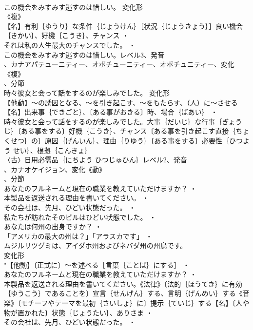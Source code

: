 \documentclass[8pt]{extreport}
\begin{document}
\begin{CJK}{UTF8}{min}
\\	この機会をみすみす逃すのは惜しい。	変化形 
\\	《複》
\\	【名】有利｛ゆうり｝な条件｛じょうけん｝［状況｛じょうきょう｝］良い機会｛きかい｝、好機｛こうき｝、チャンス ・
\\	それは私の人生最大のチャンスでした。 ・
\\	この機会をみすみす逃すのは惜しい。レベル3、発音
\\	、カナアパテューニティー、オポチューニティー、オポチュニティー、変化《複》
\\	、分節
\\	時々彼女と会って話をするのが楽しみでした。	変化形 
\\	【他動】～の誘因となる、～を引き起こす、～をもたらす、（人）に～させる【名】出来事｛できごと｝、〔ある事がおきる〕時、場合｛ばあい｝ ・
\\	時々彼女と会って話をするのが楽しみでした。大事｛だいじ｝な行事｛ぎょうじ｝〔ある事をする〕好機｛こうき｝、チャンス〔ある事を引き起こす直接｛ちょくせつ｝の〕原因｛げんいん｝、理由｛りゆう｝〔ある事をする〕必要性｛ひつよう せい｝、根拠｛こんきょ｝
\\	〈古〉日用必需品｛にちよう ひつじゅひん｝レベル2、発音
\\	、カナオケイジョン、変化《動》
\\	、分節
\\	あなたのフルネームと現在の職業を教えていただけますか？ ・
\\	本製品を返送される理由を書いてください。 ・
\\	その会社は、先月、ひどい状態だった。 ・
\\	私たちが訪れたそのビルはひどい状態でした。 ・
\\	あなたは何州の出身ですか？ ・
\\	「アメリカの最大の州は？」「アラスカです」 ・
\\	ムジルリツグミは、アイダホ州およびネバダ州の州鳥です。
\\	変化形 
\\	"【他動】〔正式に〕～を述べる［言葉｛ことば｝にする］ ・
\\	あなたのフルネームと現在の職業を教えていただけますか？ ・
\\	本製品を返送される理由を書いてください。《法律》〔法的｛ほうてき｝に有効｛ゆうこう｝であることを〕宣言｛せんげん｝する、言明｛げんめい｝する《音楽》〔モチーフやテーマを最初｛さいしょ｝に〕提示｛ていじ｝する【名】〔人や物が置かれた〕状態｛じょうたい｝、ありさま ・
\\	その会社は、先月、ひどい状態だった。 ・

\end{CJK}
\end{document}

